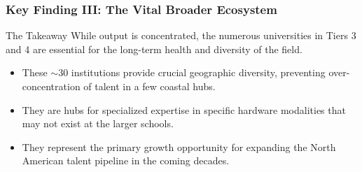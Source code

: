 \documentclass[aspectratio=169]{beamer}
\begin{document}
\begin{frame}
    \frametitle{Key Finding III: The Vital Broader Ecosystem}
    
    \begin{alertblock}{The Takeaway}
        While output is concentrated, the numerous universities in Tiers 3 and 4 are essential for the long-term health and diversity of the field.
    \end{alertblock}
    
    \begin{itemize}
        \item These $\sim$30 institutions provide crucial geographic diversity, preventing over-concentration of talent in a few coastal hubs.
        \item They are hubs for specialized expertise in specific hardware modalities that may not exist at the larger schools.
        \item They represent the primary growth opportunity for expanding the North American talent pipeline in the coming decades.
    \end{itemize}
\end{frame}
\end{document}
